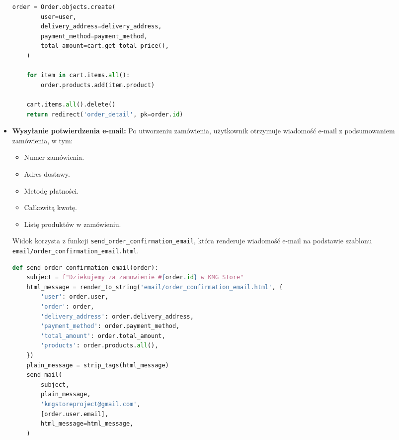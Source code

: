 \documentclass[12pt,a4paper,oneside]{article}
\theoremstyle{definition}
\numberwithin{equation}{section}
\begin{document}
\begin{itemize}
\begin{lstlisting}[language=Python, caption=Kod metody create_order]
    order = Order.objects.create(
        user=user,
        delivery_address=delivery_address,
        payment_method=payment_method,
        total_amount=cart.get_total_price(),
    )

    for item in cart.items.all():
        order.products.add(item.product)

    cart.items.all().delete()
    return redirect('order_detail', pk=order.id)
    \end{lstlisting}

    \item \textbf{Wysyłanie potwierdzenia e-mail:}
    Po utworzeniu zamówienia, użytkownik otrzymuje wiadomość e-mail z podsumowaniem zamówienia, w tym:
    \begin{itemize}
        \item Numer zamówienia.
        \item Adres dostawy.
        \item Metodę płatności.
        \item Całkowitą kwotę.
        \item Listę produktów w zamówieniu.
    \end{itemize}
    Widok korzysta z funkcji \texttt{send\_order\_confirmation\_email}, która renderuje wiadomość e-mail na podstawie szablonu \texttt{email/order\_confirmation\_email.html}.
    \begin{lstlisting}[language=Python]
def send_order_confirmation_email(order):
    subject = f"Dziekujemy za zamowienie #{order.id} w KMG Store"
    html_message = render_to_string('email/order_confirmation_email.html', {
        'user': order.user,
        'order': order,
        'delivery_address': order.delivery_address,
        'payment_method': order.payment_method,
        'total_amount': order.total_amount,
        'products': order.products.all(),
    })
    plain_message = strip_tags(html_message)
    send_mail(
        subject,
        plain_message,
        'kmgstoreproject@gmail.com',
        [order.user.email],
        html_message=html_message,
    )
    \end{lstlisting}

\end{itemize}
\end{document}
